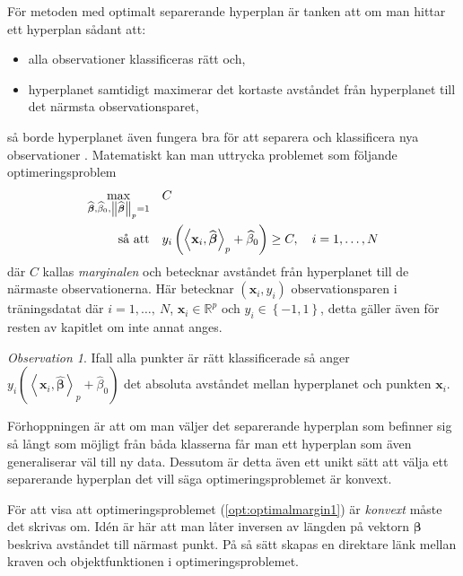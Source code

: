 \documentclass[a4paper, 12pt]{report}
\theoremstyle{definition}
\theoremstyle{remark}
\newtheorem*{rem}{Observation}
\newcommand{\bfbeta}{{\boldsymbol{\beta}}}
\newcommand{\bfx}{\mathbf{x}}
\newcommand{\llangle}{\left\langle}
\newcommand{\rrangle}{\right\rangle}
\newcommand{\inner}[2]{\llangle #1, #2 \rrangle}
\begin{document}
För metoden med optimalt separerande hyperplan är tanken att om man hittar ett hyperplan sådant att:
\begin{itemize}
	\item alla observationer klassificeras rätt och,
	\item hyperplanet samtidigt maximerar det kortaste avståndet från hyperplanet till det närmsta observationsparet,
\end{itemize}
så borde hyperplanet även fungera bra för att separera och klassificera nya observationer \cite{VapnikLerner1963}.
Matematiskt kan man uttrycka problemet som följande optimeringsproblem
\begin{equation}\label{opt:optimalmargin1}
\begin{aligned}
	 \operatornamewithlimits{max}_{\widehat{\bfbeta},\widehat{\beta}_0,\left\|\widehat{\bfbeta}\right\|_p=1}& & &C\\
	 \text{så att}& & &y_i\left(\inner{\bfx_i}{\widehat{\bfbeta}}_p+\widehat{\beta}_0\right)\geq C,\quad i=1,\dots,N
\end{aligned}
\end{equation}
där $C$ kallas \emph{marginalen} och betecknar avståndet från hyperplanet till de närmaste observationerna. Här betecknar $\left(\bfx_i, y_i\right)$ observationsparen i träningsdatat där $i=1,\dots,~N$, $\bfx_i\in\mathbb{R}^p$ och $y_i\in\left\{-1,1 \right\}$, detta gäller även för resten av kapitlet om inte annat anges.
\begin{rem}
	Ifall alla punkter är rätt klassificerade så anger $y_i\left(\inner{\bfx_i}{\widehat{\bfbeta}}_p+\widehat{\beta}_0\right)$ det absoluta avståndet mellan hyperplanet och punkten $\mathbf{x}_i$.
\end{rem}

Förhoppningen är att om man väljer det separerande hyperplan som befinner sig så långt som möjligt från båda klasserna får man ett hyperplan som även generaliserar väl till ny data. Dessutom är detta även ett unikt sätt att välja ett separerande hyperplan det vill säga optimeringsproblemet är konvext. %

För att visa att optimeringsproblemet (\ref{opt:optimalmargin1}) är \textit{konvext} måste det skrivas om. Idén är här att man låter inversen av längden på vektorn $\bfbeta$ beskriva avståndet till närmast punkt. På så sätt skapas en direktare länk mellan kraven och objektfunktionen i optimeringsproblemet.
\end{document}
